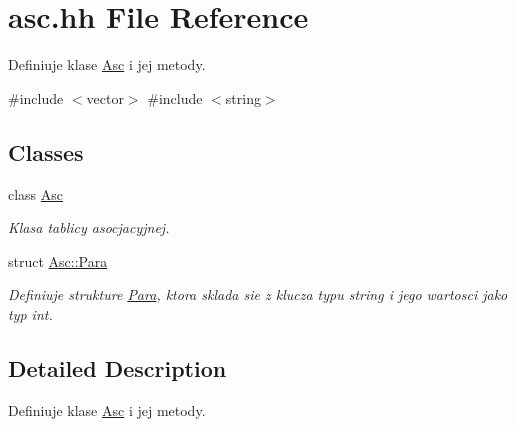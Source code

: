 \hypertarget{asc_8hh}{\section{asc.\-hh \-File \-Reference}
\label{asc_8hh}
}


\-Definiuje klase \hyperlink{class_asc}{\-Asc} i jej metody.  


{\ttfamily \#include $<$vector$>$}\*
{\ttfamily \#include $<$string$>$}\*
\subsection*{\-Classes}
\begin{DoxyCompactItemize}
\item 
class \hyperlink{class_asc}{\-Asc}
\begin{DoxyCompactList}\small\item\em \-Klasa tablicy asocjacyjnej. \end{DoxyCompactList}\item 
struct \hyperlink{struct_asc_1_1_para}{\-Asc\-::\-Para}
\begin{DoxyCompactList}\small\item\em \-Definiuje strukture \hyperlink{struct_asc_1_1_para}{\-Para}, ktora sklada sie z klucza typu string i jego wartosci jako typ int. \end{DoxyCompactList}\end{DoxyCompactItemize}


\subsection{\-Detailed \-Description}
\-Definiuje klase \hyperlink{class_asc}{\-Asc} i jej metody. 